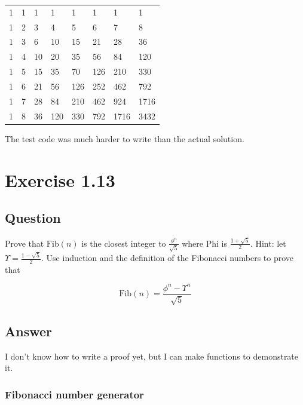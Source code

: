 \documentclass[
]{article}
\begin{document}
\begin{longtable}[]{@{}llllllll@{}}
\toprule
\endhead
1 & 1 & 1 & 1 & 1 & 1 & 1 & 1 \\
1 & 2 & 3 & 4 & 5 & 6 & 7 & 8 \\
1 & 3 & 6 & 10 & 15 & 21 & 28 & 36 \\
1 & 4 & 10 & 20 & 35 & 56 & 84 & 120 \\
1 & 5 & 15 & 35 & 70 & 126 & 210 & 330 \\
1 & 6 & 21 & 56 & 126 & 252 & 462 & 792 \\
1 & 7 & 28 & 84 & 210 & 462 & 924 & 1716 \\
1 & 8 & 36 & 120 & 330 & 792 & 1716 & 3432 \\
\bottomrule
\end{longtable}

The test code was much harder to write than the actual solution.

\hypertarget{exercise-1.13}{%
\section{Exercise 1.13}\label{exercise-1.13}}

\hypertarget{question-12}{%
\subsection{Question}\label{question-12}}

Prove that \(\text{Fib}(n)\) is the closest integer to
\(\frac{ϕ^n}{\sqrt{5}}\) where Phi is \(\frac{1 + \sqrt{5}}{2}\). Hint:
let \(Υ = \frac{1 - \sqrt{5}}{2}\). Use induction and the definition of
the Fibonacci numbers to prove that

\[
 \text{Fib}(n) = \frac{ϕ^n - Υ^n}{\sqrt{5}}
\]

\hypertarget{answer-12}{%
\subsection{Answer}\label{answer-12}}

I don't know how to write a proof yet, but I can make functions to
demonstrate it.

\hypertarget{fibonacci-number-generator}{%
\subsubsection{Fibonacci number
generator}\label{fibonacci-number-generator}}
\end{document}
